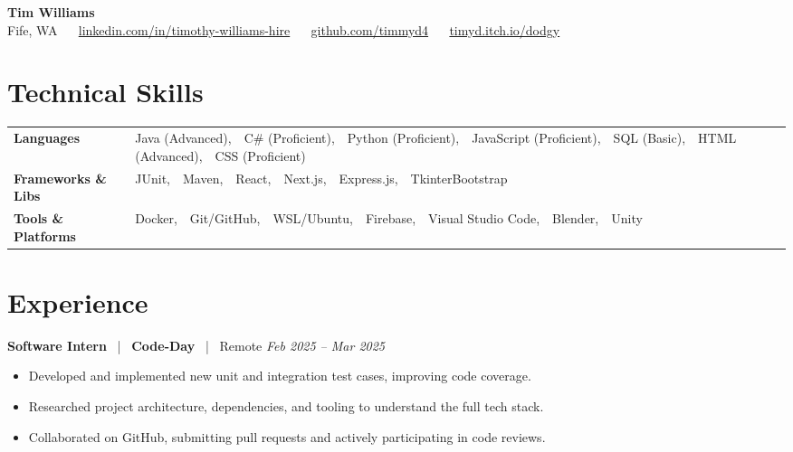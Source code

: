 \documentclass[10pt, letterpaper]{article}
\newcommand{\jobhead}[4]{%
  \vspace{5pt}%
  {\bfseries\color{dark}#1}%
  ~{\color{light}|}~%
  {\bfseries\color{navy}#2}%
  ~{\color{light}|}~%
  {\color{light}#3}%
  \hfill{\color{light}\small\textit{#4}}\\[-2pt]%
}
\newcommand{\skillrow}[2]{%
  {\bfseries #1} & #2 \\[2pt]%
}
\begin{document}

\begin{center}
  {\huge\bfseries\color{navy} Tim Williams}\\[4pt]
  {\small\color{light}
    Fife, WA
    ~\textbullet~
    \href{https://linkedin.com/in/timothy-williams-hire}{linkedin.com/in/timothy-williams-hire}
    ~\textbullet~
    \href{https://github.com/timmyd4}{github.com/timmyd4}
    ~\textbullet~
    \href{https://timyd.itch.io/dodgy}{timyd.itch.io/dodgy}
  }
\end{center}

\vspace{2pt}

\section{Technical Skills}

\begin{tabular}{@{}p{1.6in} p{5.2in}@{}}
  \skillrow{Languages}{Java (Advanced),\ \ C\# (Proficient),\ \ Python (Proficient),\ \ JavaScript (Proficient),\ \ SQL (Basic),\ \ HTML (Advanced),\ \ CSS (Proficient)}
  \skillrow{Frameworks \& Libs}{JUnit,\ \ Maven,\ \ React,\ \ Next.js,\ \ Express.js,\ \ TkinterBootstrap}
  \skillrow{Tools \& Platforms}{Docker,\ \ Git/GitHub,\ \ WSL/Ubuntu,\ \ Firebase,\ \ Visual Studio Code,\ \ Blender,\ \ Unity}
\end{tabular}

\section{Experience}

\jobhead{Software Intern}{Code-Day}{Remote}{Feb 2025 – Mar 2025}
\begin{itemize}
  \item Developed and implemented new unit and integration test cases, improving code coverage.
  \item Researched project architecture, dependencies, and tooling to understand the full tech stack.
  \item Collaborated on GitHub, submitting pull requests and actively participating in code reviews.
\end{itemize}
\end{document}
